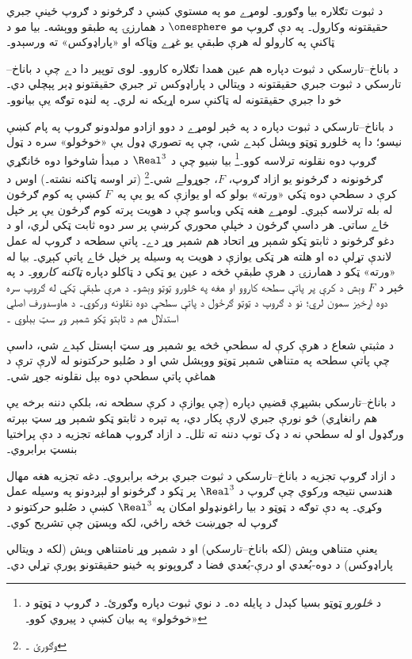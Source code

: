 \documentclass[../../../include/open-logic-section]{subfiles}
\begin{document}
د ثبوت تګلاره بيا وګورو۔ لومړے مو په مستوي کښې د
ګرځونو د ګروپ ځينې جبري حقيقتونه وکارول۔ په دې ګروپ
مو $\onesphere$ د همارزۍ په طبقو ووېشه۔ بيا مو د
ټاکنې په کارولو له هرې طبقې يو غړے وټاکه او
«پاراډوکس» ته ورسېدو۔

د باناخ--تارسکي د ثبوت دپاره هم عين همدا تګلاره
کاروو۔ لوی توپير دا دے چې د باناخ--تارسکي د ثبوت
جبري حقيقتونه د ويتالي د پاراډوکس تر جبري حقيقتونو
ډېر پېچلي دي۔ خو دا جبري حقيقتونه له ټاکنې سره
اړيکه نه لري۔ په لنډه توګه يې بيانوو۔

د باناخ--تارسکي د ثبوت دپاره د 
په څېر لومړے د دوو ازادو مولدونو ګروپ په پام کښې نيسو؛ دا په
څلورو ټوټو وېشل کېدے شي، چې په تصوري ډول يې
«خوځولو» سره د ټول ګروپ دوه نقلونه ترلاسه کوو۔\footnote{د
\emph{څلورو} ټوټو بسيا کېدل د \cite{Robinson1947}
پايله ده۔ د نوي ثبوت دپاره \citet[Theorem 5.2]{Wagon2016}
وګورئ۔ د ګروپ د ټوټو د «خوځولو» په بيان کښې د
\citet[p.~3]{Weston2003} پيروي کوو۔} بيا ښيو چې
د $\Real^3$ د مبدأ شاوخوا دوه ځانګړي ګرځونونه د
ګرځونو يو ازاد ګروپ، $F$، جوړولے شي۔\footnote{وګورئ
\citet[Theorem 2.1]{Wagon2016}۔} (تر اوسه ټاکنه نشته۔)
اوس د کرې د سطحې دوه ټکي «ورته» بولو که او يوازې
که يو يې په~$F$ کښې په کوم ګرځون له بله ترلاسه کېږي۔ لومړے هغه
ټکي وباسو چې د هويت پرته کوم ګرځون يې پر خپل ځاے
ساتي۔ هر داسې ګرځون د خپلې محوري کرښې پر سر دوه ثابت
ټکي لري، او د دغو ګرځونو د ثابتو ټکو شمېر وړ اتحاد هم شمېر وړ دے۔
پاتې سطحه د ګروپ له عمل لاندې تړلې ده او هلته هر ټکی
يوازې د هويت په وسيله پر خپل ځاے پاتې کېږي۔
بيا له «ورته» ټکو د همارزۍ د هرې طبقې څخه د عين يو
ټکي د ټاکلو دپاره \emph{ټاکنه کاروو}۔ د
 په څېر د $F$ وېش د کرې
پر پاتې سطحه کاروو او هغه په څلورو ټوټو وېشو۔
د هرې طبقې ټکي له ګروپ سره دوه اړخيز سمون لري؛ نو د
ګروپ د ټوټو ګرځول د پاتې سطحې دوه نقلونه ورکوي۔
د هاوسدورف اصلي استدلال هم د ثابتو ټکو شمېر وړ سټ
بېلوي \citep[p.~432]{Hausdorff1914}۔

\begin{thm}
د مثبتې شعاع د هرې کرې له سطحې څخه يو شمېر وړ سټ
اېستل کېدے شي، داسې چې پاتې سطحه په متناهي شمېر ټوټو
ووېشل شي او د صُلبو حرکتونو له لارې ترې د هماغې پاتې
سطحې دوه بېل نقلونه جوړ شي۔
\end{thm}

د باناخ--تارسکي بشپړې قضيې دپاره (چې يوازې د کرې
سطحه نه، بلکې دننه برخه يې هم رانغاړي) څو نورې جبري
لارې پکار دي، په تېره د ثابتو ټکو شمېر وړ سټ بېرته
ورګډول او له سطحې نه د ډک توپ دننه ته تلل۔ د ازاد ګروپ
هماغه تجزيه د دې پراختيا بنسټ برابروي۔
\begin{explain}
  د ازاد ګروپ تجزيه د باناخ--تارسکي د ثبوت جبري برخه
  برابروي۔ دغه تجزيه هغه مهال هندسي نتيجه ورکوي چې
  ګروپ د $\Real^3$ پر ټکو د ګرځونو او لېږدونو په
  وسيله عمل وکړي۔ په دې توګه د ټوټو د بيا راغونډولو
  امکان په $\Real^3$ کښې د صُلبو حرکتونو د ګروپ له جوړښت څخه راځي،
  لکه وېسټن چې تشريح کوي۔ \cite[p.~16]{Weston2003}
\end{explain}
يعنې متناهي وېش (لکه باناخ--تارسکي) او د شمېر وړ
نامتناهي وېش (لکه د ويتالي پاراډوکس) د دوه-بُعدي
او درې-بُعدي فضا د ګروپونو په ځينو حقيقتونو پورې تړلي دي۔
\end{document}
